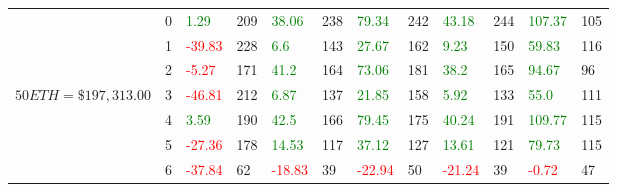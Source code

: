 \begin{table}[htb!]
\begin{adjustwidth}{-0.9in}{-0.9in}
\begin{tabular}{|p{5em}|p{2em}|p{3em}|p{3em}|p{3em}|p{3em}|p{3em}|p{3em}|p{3em}|p{3em}|p{3em}|p{3em}|}
            & 0 & \textcolor{green}{1.29} & 209 & \textcolor{green}{38.06} & 238 & \textcolor{green}{79.34} & 242 & \textcolor{green}{43.18} & 244 & \textcolor{green}{107.37} & 105\\\cline{3-12}
            & 1 & \textcolor{red}{-39.83} & 228 & \textcolor{green}{6.6} & 143 & \textcolor{green}{27.67} & 162 & \textcolor{green}{9.23} & 150 & \textcolor{green}{59.83} & 116\\\cline{3-12}
            & 2 & \textcolor{red}{-5.27} & 171 & \textcolor{green}{41.2} & 164 & \textcolor{green}{73.06} & 181 & \textcolor{green}{38.2} & 165 & \textcolor{green}{94.67} & 96\\\cline{3-12}
            $50 ETH = \$197,313.00$ & 3 & \textcolor{red}{-46.81} & 212 & \textcolor{green}{6.87} & 137 & \textcolor{green}{21.85} & 158 & \textcolor{green}{5.92} & 133 & \textcolor{green}{55.0} & 111\\[-3ex]\cline{3-12}
            & 4 & \textcolor{green}{3.59} & 190 & \textcolor{green}{42.5} & 166 & \textcolor{green}{79.45} & 175 & \textcolor{green}{40.24} & 191 & \textcolor{green}{109.77} & 115\\\cline{3-12}
            & 5 & \textcolor{red}{-27.36} & 178 & \textcolor{green}{14.53} & 117 & \textcolor{green}{37.12} & 127 & \textcolor{green}{13.61} & 121 & \textcolor{green}{79.73} & 115\\\cline{3-12}
            & 6 & \textcolor{red}{-37.84} & 62 & \textcolor{red}{-18.83} & 39 & \textcolor{red}{-22.94} & 50 & \textcolor{red}{-21.24} & 39 & \textcolor{red}{-0.72} & 47\\\hline\hline


\end{tabular}
\end{adjustwidth}
\end{table}
